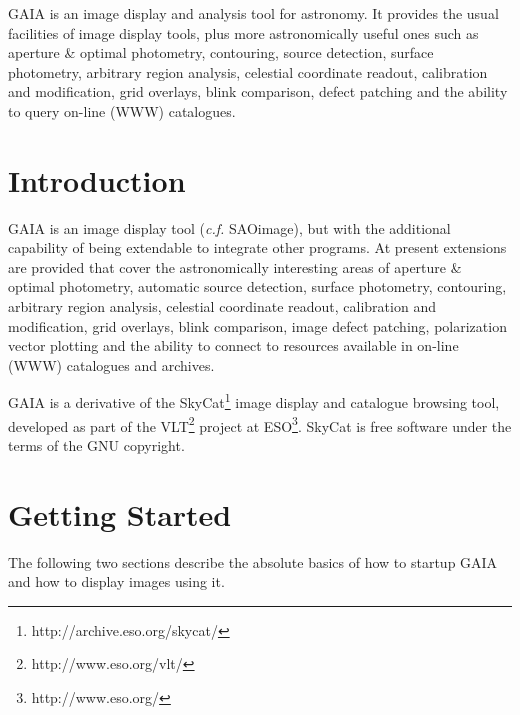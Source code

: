 \documentclass[twoside,11pt]{article}
\newcommand{\stardocinitials}  {SUN}
\newcommand{\stardocnumber}    {214.12}
\newcommand{\stardocabstract} {GAIA is an image display and analysis
tool for astronomy. It provides the usual facilities of image display
tools, plus more astronomically useful ones such as aperture \& optimal
photometry, contouring, source detection, surface photometry,
arbitrary region analysis, celestial coordinate readout, calibration
and modification, grid overlays, blink comparison, defect patching and
the ability to query on-line (WWW) catalogues.}
\newcommand{\stardocname}{\stardocinitials /\stardocnumber}
\newcommand{\htmladdnormallinkfoot}[2]{#1\footnote{#2}}
\newenvironment{latexonly}{}{}
\newcommand{\xref}[3]{#1}
\newcommand{\xlabel}[1]{}
\renewcommand{\_}{\texttt{\symbol{95}}}
\renewcommand{\thepage}{\roman{page}}
\begin{document}
\stardocabstract
  \newpage
  \begin{latexonly}
    \setlength{\parskip}{0mm}
    \tableofcontents
    \setlength{\parskip}{\medskipamount}
    \markboth{\stardocname}{\stardocname}
  \end{latexonly}
\cleardoublepage
\renewcommand{\thepage}{\arabic{page}}
\setcounter{page}{1}


\section{Introduction\xlabel{introduction}\label{introduction}}

GAIA is an image display tool (\textit{c.f.} \xref{SAOimage}{sun166}{}), 
but with the additional capability of being extendable to integrate
other programs.  At present extensions are provided that cover the
astronomically interesting areas of aperture \& optimal photometry,
automatic source detection, surface photometry, contouring, arbitrary
region analysis, celestial coordinate readout, calibration and
modification, grid overlays, blink comparison, image defect patching, 
polarization vector plotting and the ability to connect to resources
available in on-line (WWW) catalogues and archives.

GAIA is a derivative of the
\htmladdnormallinkfoot{SkyCat}{http://archive.eso.org/skycat/} image
display and catalogue browsing tool, developed as part of the
\htmladdnormallinkfoot{VLT}{http://www.eso.org/vlt/} project at
\htmladdnormallinkfoot{ESO}{http://www.eso.org/}. SkyCat is free software
under the terms of the GNU copyright.

\section{\xlabel{getting_started}Getting Started}

The following two sections describe the absolute basics of how to
startup GAIA and how to display images using it. 
\end{document}

